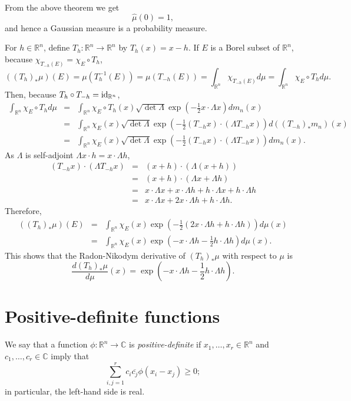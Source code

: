\documentclass{article}
\newcommand{\id}{\ensuremath\mathrm{id}}
\theoremstyle{definition}
\theoremstyle{definition}
\begin{document}
From the above theorem we get 
\[
\hat{\mu}(0)=1,
\]
and hence a Gaussian measure is a probability measure.

For $h \in \mathbb{R}^n$, define $T_h:\mathbb{R}^n \to \mathbb{R}^n$ by $T_h(x)=x-h$. 
If $E$ is a Borel subset of $\mathbb{R}^n$, because $\chi_{T_{-h}(E)}=\chi_E \circ T_h$,
\[
((T_h)_* \mu) (E)=\mu(T_h^{-1}(E))=\mu(T_{-h}(E))=\int_{\mathbb{R}^n} \chi_{T_{-h}(E)} d\mu=
\int_{\mathbb{R}^n} \chi_E \circ T_h d\mu.
\]
Then, because $T_h \circ T_{-h} = \id_{\mathbb{R}^n}$, 
\begin{eqnarray*}
\int_{\mathbb{R}^n} \chi_E \circ T_h d\mu&=&\int_{\mathbb{R}^n}\chi_E \circ T_h (x)  \sqrt{\det \Lambda} \exp\left(-\frac{1}{2} x\cdot \Lambda x \right) dm_n(x)\\
&=&\int_{\mathbb{R}^n}\chi_E(x)  \sqrt{\det \Lambda} \exp\left(-\frac{1}{2} (T_{-h}x)\cdot (\Lambda T_{-h}x) \right) d((T_{-h})_*m_n)(x)\\
&=&\int_{\mathbb{R}^n}\chi_E(x)  \sqrt{\det \Lambda} \exp\left(-\frac{1}{2} (T_{-h}x)\cdot (\Lambda T_{-h}x) \right) dm_n(x).
\end{eqnarray*}
As $\Lambda$ is self-adjoint $\Lambda x\cdot  h =  x \cdot \Lambda h$,
\begin{eqnarray*}
(T_{-h}x)\cdot (\Lambda T_{-h}x)&=&(x+h)\cdot (\Lambda(x+h))\\
&=&(x+h)\cdot (\Lambda x + \Lambda h)\\
&=&x\cdot \Lambda x + x\cdot \Lambda h + h \cdot \Lambda x + h \cdot \Lambda h\\
&=&x\cdot \Lambda x + 2x\cdot \Lambda h + h \cdot \Lambda h.
\end{eqnarray*}
Therefore,
\begin{eqnarray*}
((T_h)_* \mu) (E) &=& \int_{\mathbb{R}^n} \chi_E(x) \exp\left(-\frac{1}{2}\left(2x\cdot \Lambda h + h \cdot \Lambda h\right)\right) d\mu(x)\\
&=&\int_{\mathbb{R}^n} \chi_E(x) \exp\left(-x\cdot \Lambda h -\frac{1}{2}h \cdot \Lambda h\right) d\mu(x).
\end{eqnarray*}
This shows that the Radon-Nikodym derivative of $(T_h)_*\mu$ with respect to $\mu$ is 
\[
\frac{d(T_h)_*\mu}{d\mu}(x) = \exp\left(-x\cdot \Lambda h -\frac{1}{2}h \cdot \Lambda h\right).
\]


\section{Positive-definite functions}
We say that a function $\phi:\mathbb{R}^n \to \mathbb{C}$ is {\em positive-definite}
if $x_1,\ldots,x_r \in \mathbb{R}^n$ and $c_1,\ldots,c_r \in
\mathbb{C}$ imply
that
\[
\sum_{i,j=1}^r c_i \overline{c_j} \phi(x_i-x_j) \geq 0;
\]
in particular, the left-hand side is real.
\end{document}
